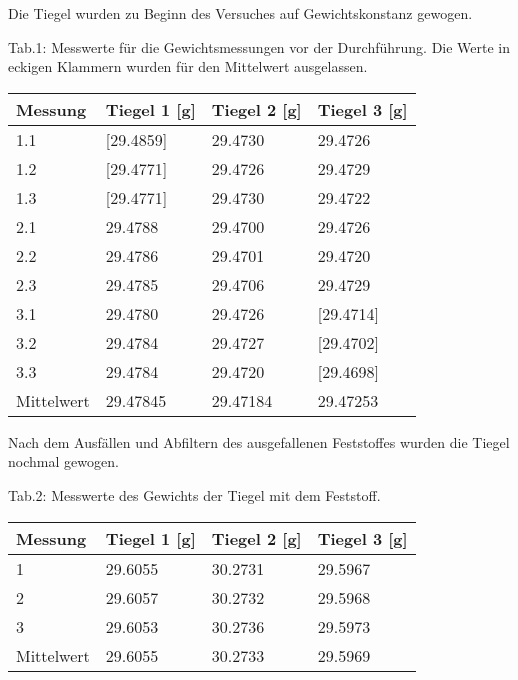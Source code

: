 \documentclass[12pt]{scrartcl} %
\begin{document}
Die Tiegel wurden zu Beginn des Versuches auf Gewichtskonstanz gewogen.
\newpage
\begin{center}
  Tab.1: Messwerte für die Gewichtsmessungen vor der Durchführung. Die Werte in eckigen Klammern wurden für den Mittelwert ausgelassen.\\
  \begin{tabular}{l l l l}
      \hline
      Messung & Tiegel 1 [g] & Tiegel 2 [g] & Tiegel 3 [g]\\
      \hline
      1.1&[29.4859]&29.4730&29.4726\\
      1.2&[29.4771]&29.4726&29.4729\\
      1.3&[29.4771]&29.4730&29.4722\\
      2.1&29.4788&29.4700&29.4726\\
      2.2&29.4786&29.4701&29.4720\\
      2.3&29.4785&29.4706&29.4729\\
      3.1&29.4780&29.4726&[29.4714]\\
      3.2&29.4784&29.4727&[29.4702]\\
      3.3&29.4784&29.4720&[29.4698]\\
      \hline
      Mittelwert&29.47845&29.47184&29.47253\\
      \hline
  \end{tabular}
\end{center}

Nach dem Ausfällen und Abfiltern des ausgefallenen Feststoffes wurden die Tiegel nochmal gewogen.
\begin{center}
  Tab.2: Messwerte des Gewichts der Tiegel mit dem Feststoff.\\
  \begin{tabular}{l l l l}
    \hline
    Messung & Tiegel 1 [g] & Tiegel 2 [g] & Tiegel 3 [g]\\
    \hline
    1&29.6055&30.2731&29.5967\\
    2&29.6057&30.2732&29.5968\\
    3&29.6053&30.2736&29.5973\\
    \hline
    Mittelwert&29.6055 & 30.2733 & 29.5969\\
    \hline
  \end{tabular}
\end{center}
\end{document}
